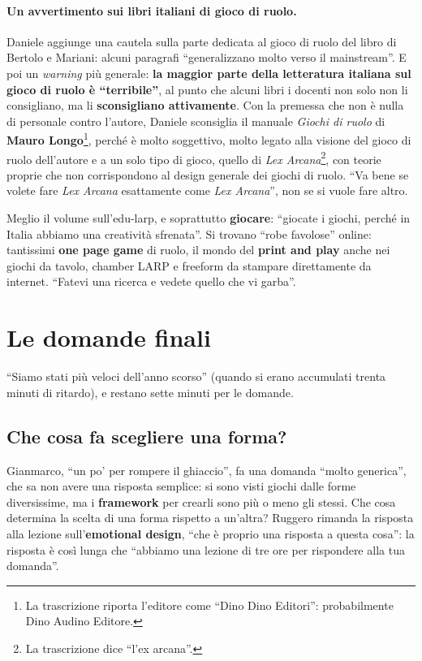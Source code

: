 \paragraph{Un avvertimento sui libri italiani di gioco di ruolo.} Daniele
aggiunge una cautela sulla parte dedicata al gioco di ruolo del libro di Bertolo
e Mariani: alcuni paragrafi ``generalizzano molto verso il mainstream''. E poi un
\emph{warning} più generale: \textbf{la maggior parte della letteratura italiana
sul gioco di ruolo è ``terribile''}, al punto che alcuni libri i docenti non solo
non li consigliano, ma li \textbf{sconsigliano attivamente}. Con la premessa che
non è nulla di personale contro l'autore, Daniele sconsiglia il manuale
\emph{Giochi di ruolo} di \textbf{Mauro Longo}\footnote{La trascrizione riporta
l'editore come ``Dino Dino Editori'': probabilmente Dino Audino Editore.},
perché è molto soggettivo, molto legato alla visione del gioco di ruolo
dell'autore e a un solo tipo di gioco, quello di \emph{Lex Arcana}\footnote{La
trascrizione dice ``l'ex arcana''.}, con teorie proprie che non corrispondono al
design generale dei giochi di ruolo. ``Va bene se volete fare \emph{Lex Arcana}
esattamente come \emph{Lex Arcana}'', non se si vuole fare altro.

Meglio il volume sull'edu-larp, e soprattutto \textbf{giocare}: ``giocate i giochi,
perché in Italia abbiamo una creatività sfrenata''. Si trovano ``robe favolose''
online: tantissimi \textbf{one page game} di ruolo, il mondo del \textbf{print and
play} anche nei giochi da tavolo, chamber LARP e freeform da stampare
direttamente da internet. ``Fatevi una ricerca e vedete quello che vi garba''.

\section{Le domande finali}
\label{a2:sec:domande}

``Siamo stati più veloci dell'anno scorso'' (quando si erano accumulati trenta
minuti di ritardo), e restano sette minuti per le domande.

\subsection{Che cosa fa scegliere una forma?}

Gianmarco, ``un po' per rompere il ghiaccio'', fa una domanda ``molto generica'',
che sa non avere una risposta semplice: si sono visti giochi dalle forme
diversissime, ma i \textbf{framework} per crearli sono più o meno gli stessi. Che
cosa determina la scelta di una forma rispetto a un'altra? Ruggero rimanda la
risposta alla lezione sull'\textbf{emotional design}, ``che è proprio una risposta
a questa cosa'': la risposta è così lunga che ``abbiamo una lezione di tre ore per
rispondere alla tua domanda''.

